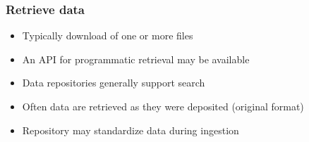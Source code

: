 \documentclass{beamer}
\begin{document}
{
	\begin{frame}[plain]
	\end{frame}
}

\begin{frame}
  \frametitle{Retrieve data}
  
  \begin{itemize}
  \item Typically download of one or more files
  \item An API for programmatic retrieval may be available
  \item Data repositories generally support search
  \item Often data are retrieved as they were deposited (original format)
  \item Repository may standardize data during ingestion
  \end{itemize}
\end{frame}
\end{document}
